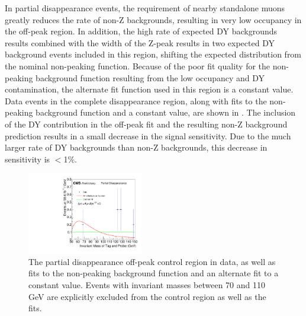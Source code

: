In partial disappearance events, the requirement of nearby standalone muons greatly reduces the rate of non-Z backgrounds, resulting in very low occupancy in the off-peak region. 
In addition, the high rate of expected DY backgrounds results combined with the width of the Z-peak results in two expected DY background events included in this region, shifting the expected distribution from the nominal non-peaking function.
Because of the poor fit quality for the non-peaking background function resulting from the low occupancy and DY contamination, the alternate fit function used in this region is a constant value.
Data events in the complete disappearance region, along with fits to the non-peaking background function and a constant value, are shown in .
The inclusion of the DY contribution in the off-peak fit and the resulting non-Z background prediction results in a small decrease in the signal sensitivity.
Due to the much larger rate of DY backgrounds than non-Z backgrounds, this decrease in sensitivity is $<$1$\%$.

\begin{figure}[htp]
    \centering
    \includegraphics[width=0.45\textwidth]{figures/offPeakFitPartialDisappearance.pdf}
     \caption[$\mu$+X background fits in the off-peak control region for partial disappearance events]{The partial disappearance off-peak control region in data, as well as fits to the non-peaking background function and an alternate fit to a constant value. Events with invariant masses between 70 and 110 GeV are explicitly excluded from the control region as well as the fits.}
    \label{fig:offPeakPartialDis}
 \end{figure}

